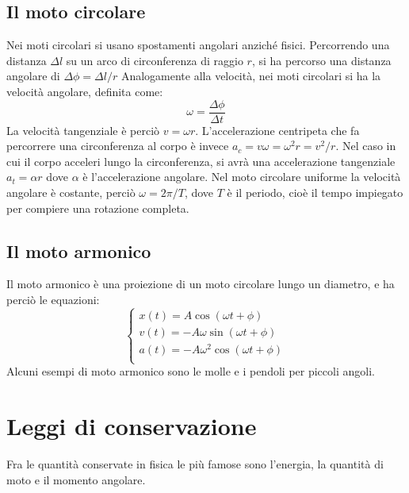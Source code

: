 \documentclass{article}
\begin{document}
\subsection{Il moto circolare}
Nei moti circolari si usano spostamenti angolari anziché fisici. Percorrendo una distanza $\Delta l$ su un arco di circonferenza di raggio $r$, si ha percorso una distanza angolare di $\Delta\phi=\Delta l/r$ 
Analogamente alla velocità, nei moti circolari si ha la velocità angolare, definita come:
\begin{equation}
    \omega = \frac{\Delta\phi}{\Delta t}
\end{equation}
La velocità tangenziale è perciò $v=\omega r$. L'accelerazione centripeta che fa percorrere una circonferenza al corpo è invece $a_c=v\omega=\omega^2r=v^2/r$.
Nel caso in cui il corpo acceleri lungo la circonferenza, si avrà una accelerazione tangenziale $a_t=\alpha r$ dove $\alpha$ è l'accelerazione angolare.
Nel moto circolare uniforme la velocità angolare è costante, perciò $\omega=2\pi/T$, dove $T$ è il periodo, cioè il tempo impiegato per compiere una rotazione completa.


\subsection{Il moto armonico}
Il moto armonico è una proiezione di un moto circolare lungo un diametro, e ha perciò le equazioni:
\begin{equation}
    \begin{cases}
        x(t)=A \cos{(\omega t + \phi)}\\
        v(t)=-A \omega\sin{(\omega t + \phi)}\\
        a(t)=-A \omega^2\cos{(\omega t + \phi)}\\
    \end{cases}
\end{equation}
Alcuni esempi di moto armonico sono le molle e i pendoli per piccoli angoli.


\section{Leggi di conservazione}
Fra le quantità conservate in fisica le più famose sono l'energia, la quantità di moto e il momento angolare.
\end{document}
